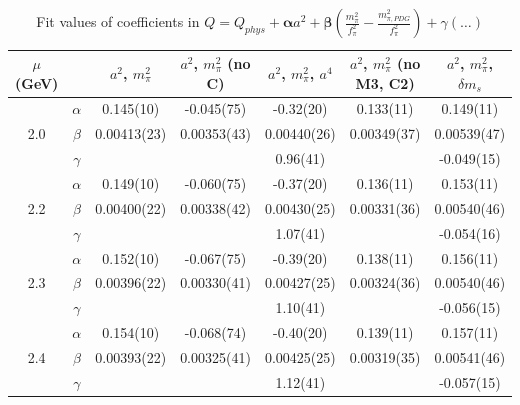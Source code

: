 \documentclass[12pt]{extarticle}
\begin{document}
\begin{table}[h!]
\begin{center}
\begin{tabular}{|c c|c|c|c|c|c|}
\hline
$\mu$ (GeV) &  & $a^2$, $m_\pi^2$& $a^2$, $m_\pi^2$ (no C)& $a^2$, $m_\pi^2$, $a^4$& $a^2$, $m_\pi^2$ (no M3, C2)& $a^2$, $m_\pi^2$, $\delta m_s$\\
\hline
\multirow{3}{0.5in}{2.0} & $\alpha$ & 0.145(10)& -0.045(75)& -0.32(20)& 0.133(11)& 0.149(11)\\
 & $\beta$ & 0.00413(23)& 0.00353(43)& 0.00440(26)& 0.00349(37)& 0.00539(47)\\
 & $\gamma$ &  &  & 0.96(41)&  & -0.049(15)\\
\hline
\multirow{3}{0.5in}{2.2} & $\alpha$ & 0.149(10)& -0.060(75)& -0.37(20)& 0.136(11)& 0.153(11)\\
 & $\beta$ & 0.00400(22)& 0.00338(42)& 0.00430(25)& 0.00331(36)& 0.00540(46)\\
 & $\gamma$ &  &  & 1.07(41)&  & -0.054(16)\\
\hline
\multirow{3}{0.5in}{2.3} & $\alpha$ & 0.152(10)& -0.067(75)& -0.39(20)& 0.138(11)& 0.156(11)\\
 & $\beta$ & 0.00396(22)& 0.00330(41)& 0.00427(25)& 0.00324(36)& 0.00540(46)\\
 & $\gamma$ &  &  & 1.10(41)&  & -0.056(15)\\
\hline
\multirow{3}{0.5in}{2.4} & $\alpha$ & 0.154(10)& -0.068(74)& -0.40(20)& 0.139(11)& 0.157(11)\\
 & $\beta$ & 0.00393(22)& 0.00325(41)& 0.00425(25)& 0.00319(35)& 0.00541(46)\\
 & $\gamma$ &  &  & 1.12(41)&  & -0.057(15)\\
\hline
\end{tabular}
\caption{Fit values of coefficients in $Q = Q_{phys} + \mathbf{\alpha} a^2 + \mathbf{\beta}\left(\frac{m_\pi^2}{f_\pi^2}-\frac{m_{\pi,PDG}^2}{f_\pi^2}\right) + \gamma(\ldots)$}
\end{center}
\end{table}




















\clearpage
\end{document}
